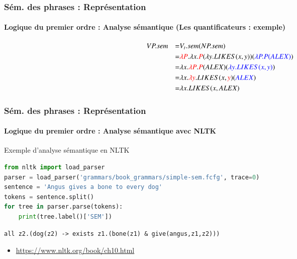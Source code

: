 \documentclass[xcolor=table]{beamer}
\begin{document}
\begin{frame}
	\frametitle{Sém. des phrases : Représentation}
	\framesubtitle{Logique du premier ordre : Analyse sémantique (Les quantificateurs : exemple)}
	
	
	\begin{center}
		\small
		\begin{align*}
		& VP.sem & = &V_t.sem(NP.sem) \\
		& & = & \textcolor{red}{\lambda P}.\lambda x.\textcolor{red}{P}(\lambda y.LIKES(x, y))(\textcolor{blue}{\lambda P.P(ALEX)}) \\
		& & = & \lambda x.\textcolor{red}{\lambda P}.\textcolor{red}{P}(ALEX)(\textcolor{blue}{\lambda y.LIKES(x, y)}) \\
		& & = & \lambda x.\textcolor{red}{\lambda y}.LIKES(x, \textcolor{red}{y})(\textcolor{blue}{ALEX}) \\
		& & = & \lambda x.LIKES(x, ALEX) \\
		\end{align*}
	\end{center}
	
\end{frame}

\begin{frame}[fragile]
	\frametitle{Sém. des phrases : Représentation}
	\framesubtitle{Logique du premier ordre : Analyse sémantique avec NLTK}
	
	\begin{exampleblock}{Exemple d'analyse sémantique en NLTK}
	{\scriptsize
		\begin{lstlisting}[language=Python]
from nltk import load_parser
parser = load_parser('grammars/book_grammars/simple-sem.fcfg', trace=0)
sentence = 'Angus gives a bone to every dog'
tokens = sentence.split()
for tree in parser.parse(tokens):
    print(tree.label()['SEM'])
		\end{lstlisting}
	}

	{\scriptsize\bfseries
	\begin{lstlisting}
all z2.(dog(z2) -> exists z1.(bone(z1) & give(angus,z1,z2)))
	\end{lstlisting}
	}
	
	\end{exampleblock}

	\begin{itemize}
		\item \url{https://www.nltk.org/book/ch10.html}
	\end{itemize}
	
\end{frame}
\end{document}
